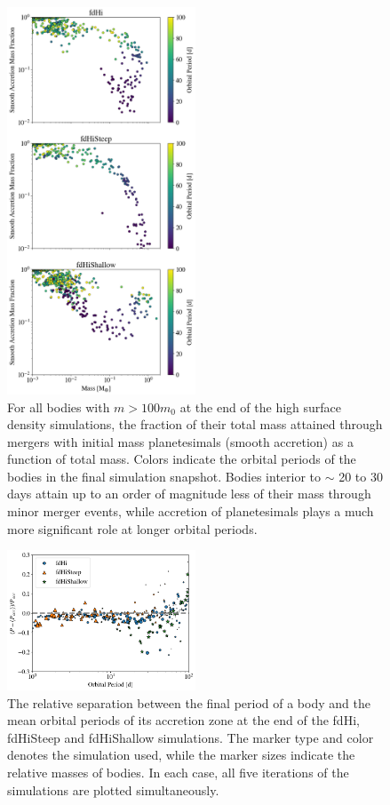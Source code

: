 \documentclass[twocolumn,linenumbers]{aastex63}
\begin{document}
\begin{figure}
\begin{center}
    \includegraphics[width=0.5\textwidth]{figures/minor_frac.png}
    \caption{For all bodies with $m > 100 m_{0}$ at the end of the high surface density simulations, the fraction of their total mass attained through mergers with initial mass planetesimals (smooth accretion) as a function of total mass. Colors indicate the orbital periods of the bodies in the final simulation snapshot. Bodies interior to $\sim$ 20 to 30 days attain up to an order of magnitude less of their mass through minor merger events, while accretion of planetesimals plays a much more significant role at longer orbital periods.\label{fig:minor_frac}}
\end{center}
\end{figure}

\begin{figure}
\begin{center}
    \includegraphics[width=0.5\textwidth]{figures/acc_zones.png}
    \caption{The relative separation between the final period
        of a body and the mean orbital periods of its accretion zone at the end of the fdHi, fdHiSteep and fdHiShallow simulations. The marker type and color denotes the simulation used, while the marker sizes indicate the relative masses of bodies. In each case, all five iterations of the simulations are plotted simultaneously.\label{fig:acc_zones}}
\end{center}
\end{figure}
\end{document}
